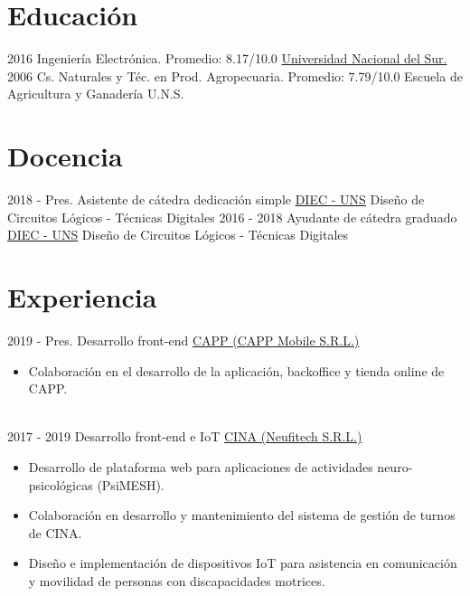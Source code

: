 \documentclass[letterpaper]{twentysecondcv} %
\begin{document}
\makeprofilefirst %

\section{Educación}
\begin{twenty}
	\twentyitem
    	{2016}
        {}
        {Ingeniería Electrónica.}
        {Promedio: 8.17/10.0}
        {\href{http://www.uns.edu.ar/}{Universidad Nacional del Sur.}}
        {}
	\twentyitem
    	{2006}
		{}
		{Cs. Naturales y Téc. en Prod. Agropecuaria.}
        {Promedio: 7.79/10.0}
        {Escuela de Agricultura y Ganadería U.N.S.}
        {}
\end{twenty}

\section{Docencia}
\begin{twenty}
    \twentyitem
    	{2018 - Pres.}
		{}
        {Asistente de cátedra dedicación simple}
        {\href{http://www.diec.uns.edu.ar/}{DIEC - UNS}}
        {}
        {Diseño de Circuitos Lógicos - Técnicas Digitales}
    \twentyitem
    	{2016 - 2018}
		{}
        {Ayudante de cátedra graduado}
        {\href{http://www.diec.uns.edu.ar/}{DIEC - UNS}}
        {}
        {Diseño de Circuitos Lógicos - Técnicas Digitales}
\end{twenty}

\section{Experiencia}
\begin{twenty} 
\twentyitem
    	{2019 - Pres.}
		{}
        {Desarrollo front-end}
        {\href{http://www.webcapp.com/}{CAPP (CAPP Mobile S.R.L.)}}
        {}
        {\begin{itemize}
        \item Colaboración en el desarrollo de la aplicación, backoffice y tienda online de CAPP.
        \end{itemize}}\\
\twentyitem
    	{2017 - 2019}
		{}
        {Desarrollo front-end e IoT}
        {\href{http://www.cinaweb.org/}{CINA (Neufitech S.R.L.)}}
        {}
        {\begin{itemize}
        \item Desarrollo de plataforma web para aplicaciones de actividades neuro-psicológicas (PsiMESH).
        \item Colaboración en desarrollo y mantenimiento del sistema de gestión de turnos de CINA.
        \item Diseño e implementación de dispositivos IoT para asistencia en comunicación y movilidad de personas con discapacidades motrices.
        \end{itemize}}
\end{twenty}
\end{document}
